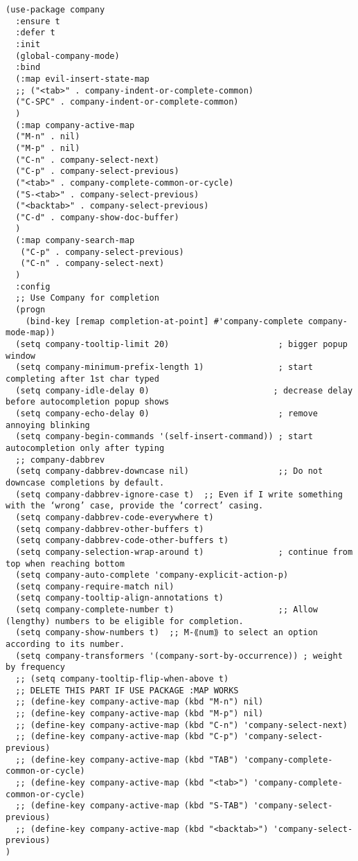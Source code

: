 \documentclass[11pt]{article}
\begin{document}
\begin{verbatim}
(use-package company
  :ensure t
  :defer t
  :init
  (global-company-mode)
  :bind
  (:map evil-insert-state-map
  ;; ("<tab>" . company-indent-or-complete-common)
  ("C-SPC" . company-indent-or-complete-common)
  )
  (:map company-active-map
  ("M-n" . nil)
  ("M-p" . nil)
  ("C-n" . company-select-next)
  ("C-p" . company-select-previous)
  ("<tab>" . company-complete-common-or-cycle)
  ("S-<tab>" . company-select-previous)
  ("<backtab>" . company-select-previous)
  ("C-d" . company-show-doc-buffer)
  )
  (:map company-search-map
   ("C-p" . company-select-previous)
   ("C-n" . company-select-next)
  )
  :config
  ;; Use Company for completion
  (progn
    (bind-key [remap completion-at-point] #'company-complete company-mode-map))
  (setq company-tooltip-limit 20)                      ; bigger popup window
  (setq company-minimum-prefix-length 1)               ; start completing after 1st char typed
  (setq company-idle-delay 0)                         ; decrease delay before autocompletion popup shows
  (setq company-echo-delay 0)                          ; remove annoying blinking
  (setq company-begin-commands '(self-insert-command)) ; start autocompletion only after typing
  ;; company-dabbrev
  (setq company-dabbrev-downcase nil)                  ;; Do not downcase completions by default.
  (setq company-dabbrev-ignore-case t)  ;; Even if I write something with the ‘wrong’ case, provide the ‘correct’ casing.
  (setq company-dabbrev-code-everywhere t)
  (setq company-dabbrev-other-buffers t)
  (setq company-dabbrev-code-other-buffers t)
  (setq company-selection-wrap-around t)               ; continue from top when reaching bottom
  (setq company-auto-complete 'company-explicit-action-p)
  (setq company-require-match nil)
  (setq company-tooltip-align-annotations t)
  (setq company-complete-number t)                     ;; Allow (lengthy) numbers to be eligible for completion.
  (setq company-show-numbers t)  ;; M-⟪num⟫ to select an option according to its number.
  (setq company-transformers '(company-sort-by-occurrence)) ; weight by frequency
  ;; (setq company-tooltip-flip-when-above t)
  ;; DELETE THIS PART IF USE PACKAGE :MAP WORKS
  ;; (define-key company-active-map (kbd "M-n") nil)
  ;; (define-key company-active-map (kbd "M-p") nil)
  ;; (define-key company-active-map (kbd "C-n") 'company-select-next)
  ;; (define-key company-active-map (kbd "C-p") 'company-select-previous)
  ;; (define-key company-active-map (kbd "TAB") 'company-complete-common-or-cycle)
  ;; (define-key company-active-map (kbd "<tab>") 'company-complete-common-or-cycle)
  ;; (define-key company-active-map (kbd "S-TAB") 'company-select-previous)
  ;; (define-key company-active-map (kbd "<backtab>") 'company-select-previous)
)
\end{verbatim}
\end{document}
